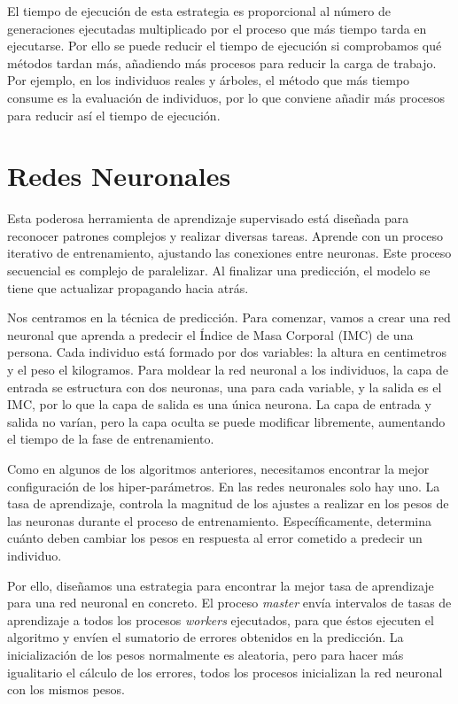 	El tiempo de ejecución de esta estrategia es proporcional al número de generaciones ejecutadas multiplicado por el proceso que más tiempo tarda en ejecutarse. Por ello se puede reducir el tiempo de ejecución si comprobamos qué métodos tardan más, añadiendo más procesos para reducir la carga de trabajo. Por ejemplo, en los individuos reales y árboles, el método que más tiempo consume es la evaluación de individuos, por lo que conviene añadir más procesos para reducir así el tiempo de ejecución.
	
	
	
	

\section{Redes Neuronales}
\label{cap:3_5}
	Esta poderosa herramienta de aprendizaje supervisado está diseñada para reconocer patrones complejos y realizar diversas tareas. Aprende con un proceso iterativo de entrenamiento, ajustando las conexiones entre neuronas. Este proceso secuencial es complejo de paralelizar. Al finalizar una predicción, el modelo se tiene que actualizar propagando hacia atrás.
	
	Nos centramos en la técnica de predicción. Para comenzar, vamos a crear una red neuronal que aprenda a predecir el Índice de Masa Corporal (IMC) de una persona. Cada individuo está formado por dos variables: la altura en centimetros y el peso el kilogramos. Para moldear la red neuronal a los individuos, la capa de entrada se estructura con dos neuronas, una para cada variable, y la salida es el IMC, por lo que la capa de salida es una única neurona. La capa de entrada y salida no varían, pero la capa oculta se puede modificar libremente, aumentando el tiempo de la fase de entrenamiento.
	
	
	Como en algunos de los algoritmos anteriores, necesitamos encontrar la mejor configuración de los hiper-parámetros. En las redes neuronales solo hay uno. La tasa de aprendizaje, controla la magnitud de los ajustes a realizar en los pesos de las neuronas durante el proceso de entrenamiento. Específicamente, determina cuánto deben cambiar los pesos en respuesta al error cometido a predecir un individuo.
	
	
	Por ello, diseñamos una estrategia para encontrar la mejor tasa de aprendizaje para una red neuronal en concreto. El proceso \textit{master} envía intervalos de tasas de aprendizaje a todos los procesos \textit{workers} ejecutados, para que éstos ejecuten el algoritmo y envíen el sumatorio de errores obtenidos en la predicción. La inicialización de los pesos normalmente es aleatoria, pero para hacer más igualitario el cálculo de los errores, todos los procesos inicializan la red neuronal con los mismos pesos.
	
